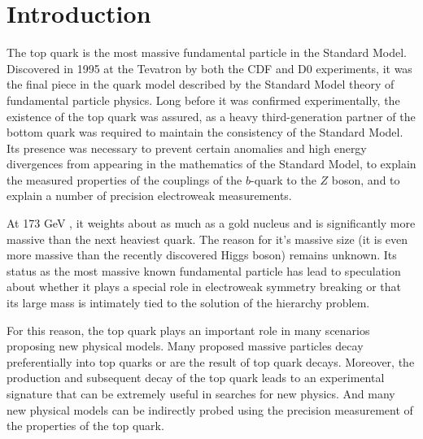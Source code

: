 
\chapter{Introduction}

%



The top quark is the most massive fundamental particle in the Standard Model.
Discovered in 1995 at the Tevatron by both the CDF and D0 experiments, it was the final piece in the quark model described by the Standard Model theory of fundamental particle physics.
Long before it was confirmed experimentally, the existence of the top quark was assured,
as a heavy third-generation partner of the bottom quark was required to maintain the consistency of the Standard Model.%
Its presence was necessary to prevent certain anomalies and high energy divergences from appearing in the mathematics of the Standard Model,
to explain the measured properties of the couplings of the $b$-quark to the $Z$ boson, and to explain a number of precision electroweak measurements.

At 173 GeV \cite{PARTICLE_DATA_GROUP}, it weights about as much as a gold nucleus and is significantly more massive than the next heaviest quark.
The reason for it's massive size (it is even more massive than the recently discovered Higgs boson) remains unknown.
Its status as the most massive known fundamental particle has lead to speculation about whether it plays a special role in electroweak symmetry breaking
or that its large mass is intimately tied to the solution of the hierarchy problem.

For this reason, the top quark plays an important role in many scenarios proposing new physical models.
Many proposed massive particles decay preferentially into top quarks or are the result of top quark decays.
Moreover, the production and subsequent decay of the top quark leads to an experimental signature that can be extremely useful in searches for new physics.
And many new physical models can be indirectly probed using the precision measurement of the properties of the top quark.

